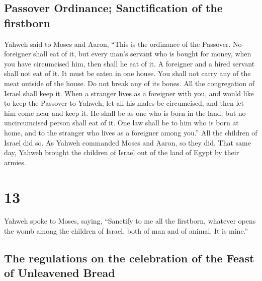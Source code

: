 \hypertarget{passover-ordinance-sanctification-of-the-firstborn}{%
\subsection{Passover Ordinance; Sanctification of the
firstborn}\label{passover-ordinance-sanctification-of-the-firstborn}}

 Yahweh said to Moses and Aaron, ``This is the ordinance
of the Passover. No foreigner shall eat of it,  but every
man's servant who is bought for money, when you have circumcised him,
then shall he eat of it.  A foreigner and a hired servant
shall not eat of it.  It must be eaten in one house. You
shall not carry any of the meat outside of the house. Do not break any
of its bones.  All the congregation of Israel shall keep
it.  When a stranger lives as a foreigner with you, and
would like to keep the Passover to Yahweh, let all his males be
circumcised, and then let him come near and keep it. He shall be as one
who is born in the land; but no uncircumcised person shall eat of it.
 One law shall be to him who is born at home, and to the
stranger who lives as a foreigner among you.''  All the
children of Israel did so. As Yahweh commanded Moses and Aaron, so they
did.  That same day, Yahweh brought the children of
Israel out of the land of Egypt by their armies.

\hypertarget{section-12}{%
\section{13}\label{section-12}}

 Yahweh spoke to Moses, saying,  ``Sanctify
to me all the firstborn, whatever opens the womb among the children of
Israel, both of man and of animal. It is mine.''

\hypertarget{the-regulations-on-the-celebration-of-the-feast-of-unleavened-bread}{%
\subsection{The regulations on the celebration of the Feast of
Unleavened
Bread}\label{the-regulations-on-the-celebration-of-the-feast-of-unleavened-bread}}

